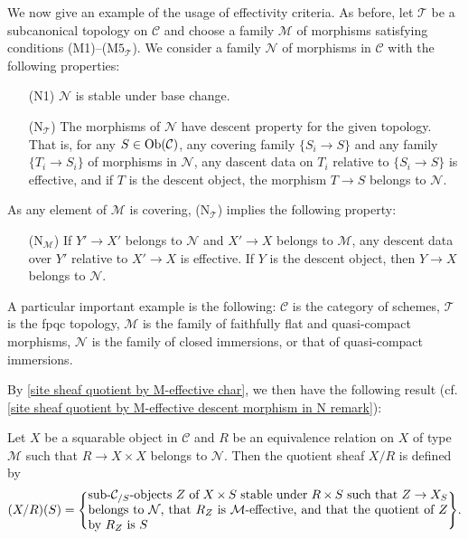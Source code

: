 We now give an example of the usage of effectivity criteria. As before, let $\mathcal{T}$ be a subcanonical topology on $\mathcal{C}$ and choose a family $\mathcal{M}$ of morphisms satisfying conditions (M1)--($\text{M5}_\mathcal{T}$). We consider a family $\mathcal{N}$ of morphisms in $\mathcal{C}$ with the following properties:
\begin{enumerate}[leftmargin=40pt]
    \item[(N1)] $\mathcal{N}$ is stable under base change.
    \item[($\text{N}_\mathcal{T}$)] The morphisms of $\mathcal{N}$ have descent property for the given topology. That is, for any $S\in\mathrm{Ob}(\mathcal{C})$, any covering family $\{S_i\to S\}$ and any family $\{T_i\to S_i\}$ of morphisms in $\mathcal{N}$, any dascent data on $T_i$ relative to $\{S_i\to S\}$ is effective, and if $T$ is the descent object, the morphism $T\to S$ belongs to $\mathcal{N}$.
\end{enumerate}
As any element of $\mathcal{M}$ is covering, ($\text{N}_\mathcal{T}$) implies the following property:
\begin{enumerate}[leftmargin=40pt]
    \item[($\text{N}_\mathcal{M}$)] If $Y'\to X'$ belongs to $\mathcal{N}$ and $X'\to X$ belongs to $\mathcal{M}$, any descent data over $Y'$ relative to $X'\to X$ is effective. If $Y$ is the descent object, then $Y\to X$ belongs to $\mathcal{N}$.
\end{enumerate}
A particular important example is the following: $\mathcal{C}$ is the category of schemes, $\mathcal{T}$ is the fpqc topology, $\mathcal{M}$ is the family of faithfully flat and quasi-compact morphisms, $\mathcal{N}$ is the family of closed immersions, or that of quasi-compact immersions.\par
By \cref{site sheaf quotient by M-effective char}, we then have the following result (cf. \cref{site sheaf quotient by M-effective descent morphism in N remark}):
\begin{proposition}\label{site sheaf quotient by type MN char}
Let $X$ be a squarable object in $\mathcal{C}$ and $R$ be an equivalence relation on $X$ of type $\mathcal{M}$ such that $R\to X\times X$ belongs to $\mathcal{N}$. Then the quotient sheaf $X/R$ is defined by
\[(X/R)(S)=\Bigg\{\parbox{4in}{%
sub-$\mathcal{C}_{/S}$-objects $Z$ of $X\times S$ stable under $R\times S$ such that $Z\to X_S$ belongs to $\mathcal{N}$, that $R_Z$ is $\mathcal{M}$-effective, and that the quotient of $Z$ by $R_Z$ is $S$%
}\Bigg\}.\]
\end{proposition}

